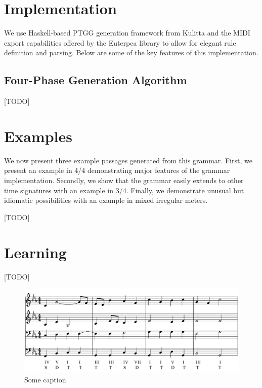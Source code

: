 \documentclass{article}
\begin{document}

\section{Implementation}

We use Haskell-based PTGG generation framework from Kulitta and the MIDI export capabilities offered by the Euterpea library \cite{euterpea} to allow for elegant rule definition and parsing. Below are some of the key features of this implementation.

\subsection{Four-Phase Generation Algorithm}

[TODO]


\section{Examples}

We now present three example passages generated from this grammar. First, we present an example in 4/4 demonstrating major features of the grammar implementation. Secondly, we show that the grammar easily extends to other time signatures with an example in 3/4. Finally, we demonstrate unusual but idiomatic possibilities with an example in mixed irregular meters.

[TODO]


\section{Learning}

[TODO]

\begin{figure}[h]
\centering
\includegraphics[width=0.9\columnwidth]{Chorale_443576165_minor.pdf}
\caption{Some caption}
\end{figure}
\end{document}
